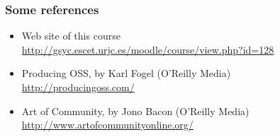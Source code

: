 \begin{frame}
\frametitle{Some references}

\begin{itemize}
\item Web site of this course \\
  \url{http://gsyc.escet.urjc.es/moodle/course/view.php?id=128}
\item Producing OSS, by Karl Fogel (O'Reilly Media) \\
  \url{http://producingoss.com/}
\item Art of Community, by Jono Bacon (O'Reilly Media) \\
  \url{http://www.artofcommunityonline.org/}
\end{itemize}

\end{frame}
